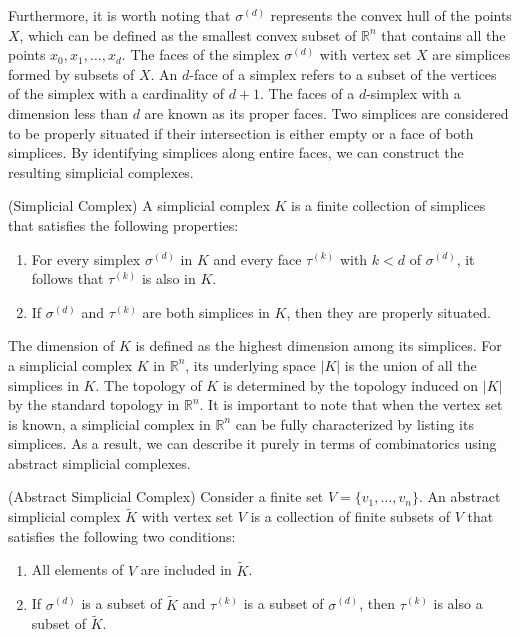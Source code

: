 Furthermore, it is worth noting that $\sigma^{(d)}$ represents the convex hull of the points $X$, which can be defined as the smallest convex subset of $\mathbb{R}^n$ that contains all the points $x_0, x_1, \ldots, x_d$. The faces of the simplex $\sigma^{(d)}$ with vertex set $X$ are simplices formed by subsets of $X$. An $d$-face of a simplex refers to a subset of the vertices of the simplex with a cardinality of $d+1$. The faces of a $d$-simplex with a dimension less than $d$ are known as its proper faces. Two simplices are considered to be properly situated if their intersection is either empty or a face of both simplices. By identifying simplices along entire faces, we can construct the resulting simplicial complexes.

\begin{definition}{(Simplicial Complex) \cite[§2.2]{boissonnat2018geometric}}
\label{simplicialcomplex}
A simplicial complex $K$ is a finite collection of simplices that satisfies the following properties:
\begin{enumerate}
	\item For every simplex $\sigma^{(d)}$ in $K$ and every face $\tau^{(k)}$ with $k < d$ of $\sigma^{(d)}$, it follows that $\tau^{(k)}$ is also in $K$.
	\item If $\sigma^{(d)}$ and $\tau^{(k)}$ are both simplices in $K$, then they are properly situated.
\end{enumerate}
\end{definition}

The dimension of $K$ is defined as the highest dimension among its simplices. For a simplicial complex $K$ in $\mathbb{R}^n$, its underlying space $\vert K \vert$ is the union of all the simplices in $K$. The topology of $K$ is determined by the topology induced on $\vert K \vert$ by the standard topology in $\mathbb{R}^n$. It is important to note that when the vertex set is known, a simplicial complex in $\mathbb{R}^n$ can be fully characterized by listing its simplices. As a result, we can describe it purely in terms of combinatorics using abstract simplicial complexes.

\begin{definition}{(Abstract Simplicial Complex) \cite[§2.3]{boissonnat2018geometric}}
\label{abstractsimplicialcomplex}
Consider a finite set $V = \{v_1, \ldots, v_n\}$. An abstract simplicial complex $\tilde{K}$ with vertex set $V$ is a collection of finite subsets of $V$ that satisfies the following two conditions:
\begin{enumerate}
	\item All elements of $V$ are included in $\tilde{K}$.
	\item If $\sigma^{(d)}$ is a subset of $\tilde{K}$ and $\tau^{(k)}$ is a subset of $\sigma^{(d)}$, then $\tau^{(k)}$ is also a subset of $\tilde{K}$.
\end{enumerate}
\end{definition}

